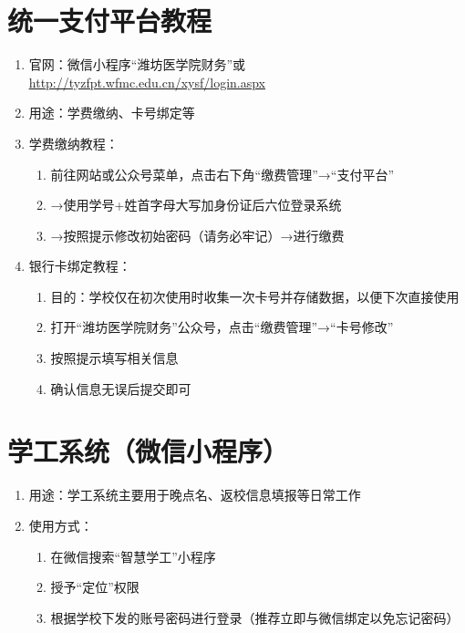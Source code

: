 \section[统一支付平台教程]{统一支付平台教程}
\label{fee_pay}
\begin{enumerate}
    \item 官网：微信小程序“潍坊医学院财务”或\uline{\href{http://tyzfpt.wfmc.edu.cn/xysf/login.aspx}{http://tyzfpt.wfmc.edu.cn/xysf/login.aspx}}
    \item 用途：学费缴纳、卡号绑定等
    \item 学费缴纳教程：
          \begin{enumerate}[（1）]
              \item 前往网站或公众号菜单，点击右下角“缴费管理”→“支付平台”
              \item →使用学号+姓首字母大写加身份证后六位登录系统
              \item →按照提示修改初始密码（请务必牢记）→进行缴费
          \end{enumerate}
    \item 银行卡绑定教程：
          \begin{enumerate}[（1）]
              \item 目的：学校仅在初次使用时收集一次卡号并存储数据，以便下次直接使用\footnotemark
              \item 打开“潍坊医学院财务”公众号，点击“缴费管理”→“卡号修改”
              \item 按照提示填写相关信息
              \item 确认信息无误后提交即可
          \end{enumerate}
\end{enumerate}

\section[学工系统（微信小程序）]{学工系统（微信小程序）}
\begin{enumerate}
    \item 用途：学工系统主要用于晚点名、返校信息填报等日常工作\footnotemark
    \item 使用方式：
          \begin{enumerate}[（1）]
              \item 在微信搜索“智慧学工”小程序
              \item 授予“定位”权限
              \item 根据学校下发的账号密码进行登录（推荐立即与微信绑定以免忘记密码）
          \end{enumerate}
\end{enumerate}

